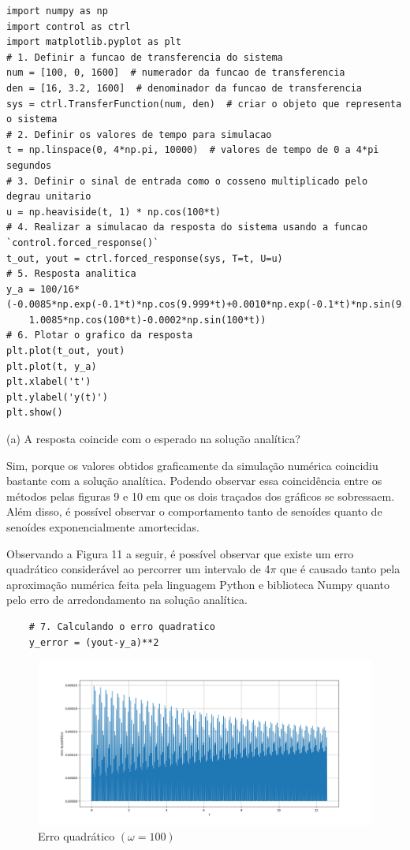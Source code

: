 \documentclass[10pt]{article}
\begin{document}
\begin{lstlisting}
import numpy as np
import control as ctrl
import matplotlib.pyplot as plt
# 1. Definir a funcao de transferencia do sistema
num = [100, 0, 1600]  # numerador da funcao de transferencia
den = [16, 3.2, 1600]  # denominador da funcao de transferencia
sys = ctrl.TransferFunction(num, den)  # criar o objeto que representa o sistema
# 2. Definir os valores de tempo para simulacao
t = np.linspace(0, 4*np.pi, 10000)  # valores de tempo de 0 a 4*pi segundos
# 3. Definir o sinal de entrada como o cosseno multiplicado pelo degrau unitario
u = np.heaviside(t, 1) * np.cos(100*t)
# 4. Realizar a simulacao da resposta do sistema usando a funcao `control.forced_response()`
t_out, yout = ctrl.forced_response(sys, T=t, U=u)
# 5. Resposta analitica
y_a = 100/16*(-0.0085*np.exp(-0.1*t)*np.cos(9.999*t)+0.0010*np.exp(-0.1*t)*np.sin(9.999*t)+
    1.0085*np.cos(100*t)-0.0002*np.sin(100*t))
# 6. Plotar o grafico da resposta
plt.plot(t_out, yout)
plt.plot(t, y_a)
plt.xlabel('t')
plt.ylabel('y(t)')
plt.show()
\end{lstlisting}

(a) A resposta coincide com o esperado na solução analítica?

\quad Sim, porque os valores obtidos graficamente da simulação numérica coincidiu bastante com a solução analítica.
Podendo observar essa coincidência entre os métodos pelas figuras 9 e 10 em que os dois traçados dos gráficos se sobressaem.
Além disso, é possível observar o comportamento tanto de senoídes quanto de senoídes exponencialmente amortecidas.

\quad Observando a Figura 11 a seguir, é possível observar que existe um erro quadrático considerável
ao percorrer um intervalo de 4$\pi$ que é causado tanto pela aproximação numérica feita pela linguagem Python e biblioteca Numpy
quanto pelo erro de arredondamento na solução analítica.

\begin{lstlisting}
    # 7. Calculando o erro quadratico
    y_error = (yout-y_a)**2
\end{lstlisting}

\begin{figure}[h]
    \centering
    \includegraphics[scale=0.4]{erro4.png}
    \caption{Erro quadrático $(\omega = 100)$}
\end{figure}
\end{document}
